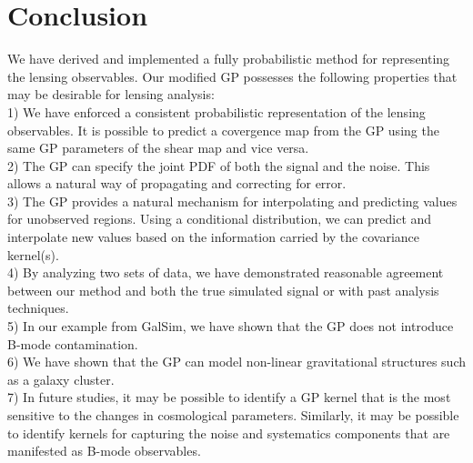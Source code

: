 




\section{Conclusion}
We have derived and implemented a fully probabilistic method for 
representing the lensing observables. 
Our modified GP possesses the following properties that may be desirable
for lensing analysis: \\ 
1) We have enforced a consistent probabilistic representation of the lensing 
observables. It is possible to predict a covergence map from the GP using
the same GP parameters of the shear map and vice versa.\\ 
2) The GP can specify the joint PDF of both the signal and the noise. 
This allows a natural way of propagating and correcting for error.\\
3) The GP provides a natural mechanism for interpolating  
and predicting values for unobserved regions. Using a conditional distribution, 
we can predict and interpolate new values based on the  information carried by
the covariance kernel(s).
\\ 
4) By analyzing two sets of data, 
we have demonstrated reasonable agreement between our method and both the true
simulated signal or with past analysis techniques.  \\
5) In our example from {\sc GalSim}, we have shown that the GP does not
introduce B-mode contamination. \\
6) We have shown that the GP can model non-linear gravitational structures such 
as a galaxy cluster. \\ 
7) In future studies, it may be possible to identify a GP kernel that is the most 
sensitive to the changes in cosmological parameters. Similarly, it may be
possible to identify kernels for capturing the noise and systematics components 
that are manifested as B-mode observables.

